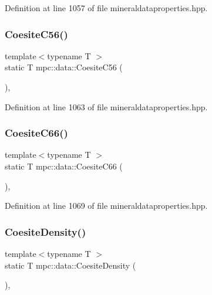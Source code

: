 Definition at line 1057 of file mineraldataproperties.\+hpp.

\mbox{\label{namespacempc_1_1data_ac645e3b0484f84923612da5b0dbd6de7}} 
\subsubsection{\texorpdfstring{Coesite\+C56()}{CoesiteC56()}}
{\footnotesize\ttfamily template$<$typename T $>$ \\
static T mpc\+::data\+::\+Coesite\+C56 (\begin{DoxyParamCaption}{ }\end{DoxyParamCaption})\hspace{0.3cm}{\ttfamily [inline]}, {\ttfamily [static]}}



Definition at line 1063 of file mineraldataproperties.\+hpp.

\mbox{\label{namespacempc_1_1data_a67300ccd5936befbc06526c524401153}} 
\subsubsection{\texorpdfstring{Coesite\+C66()}{CoesiteC66()}}
{\footnotesize\ttfamily template$<$typename T $>$ \\
static T mpc\+::data\+::\+Coesite\+C66 (\begin{DoxyParamCaption}{ }\end{DoxyParamCaption})\hspace{0.3cm}{\ttfamily [inline]}, {\ttfamily [static]}}



Definition at line 1069 of file mineraldataproperties.\+hpp.

\mbox{\label{namespacempc_1_1data_a991394fa685497afccfa74740b6da63c}} 
\subsubsection{\texorpdfstring{Coesite\+Density()}{CoesiteDensity()}}
{\footnotesize\ttfamily template$<$typename T $>$ \\
static T mpc\+::data\+::\+Coesite\+Density (\begin{DoxyParamCaption}{ }\end{DoxyParamCaption})\hspace{0.3cm}{\ttfamily [inline]}, {\ttfamily [static]}}



